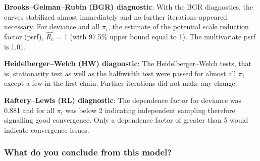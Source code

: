 \documentclass[12pt]{article}
\begin{document}

\textbf{Brooks–Gelman–Rubin (BGR) diagnostic}: With the BGR diagnostics, the curves stabilized almost immediately and no further iterations appeared necessary. For deviance and all $\pi_i$, the estimate of the potential scale reduction factor (psrf), $\hat{R_c}$ = 1 (with 97.5\% upper bound equal to 1). The multivariate psrf is 1.01.

    

\textbf{Heidelberger–Welch (HW) diagnostic}: The Heidelberger–Welch tests, that is, stationarity test as well as the halfiwidth test were passed for almost all $\pi_i$ except a few in the first chain. Further iterations did not make any change.

\textbf{Raftery–Lewis (RL) diagnostic}: The dependence factor for deviance was 0.881 and for all $\pi_i$ was below 2 indicating independent sampling therefore signalling good convergence. Only a dependence factor of greater than 5 would indicate convergence issues.


\subsubsection{What do you conclude from this model?}

\end{document}
